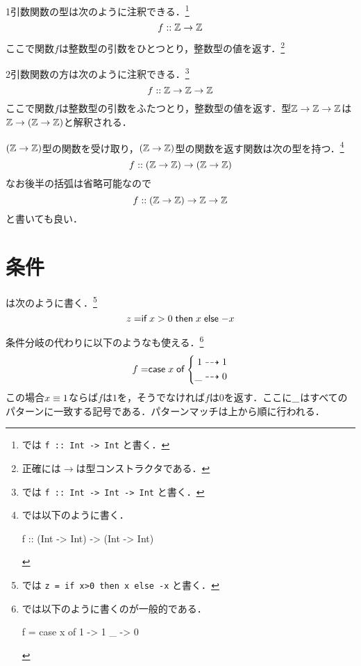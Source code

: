 \documentclass[platex,a5paper,twoside,fleqn,draft]{jsbook}
\newcommand{\keyword}[1]{\textgt{\textbf{#1}}}
\begin{document}
1引数関数の型は次のように注釈できる．\footnote{\haskell では \verb|f :: Int -> Int| と書く．}
\begin{equation}
f::\mathord{\mathbb{Z}}\rightarrow\mathord{\mathbb{Z}}
\end{equation}
ここで関数$f$は整数型の引数をひとつとり，整数型の値を返す．\footnote{正確には$\rightarrow$は型コンストラクタである．}

2引数関数の方は次のように注釈できる．\footnote{\haskell では \verb|f :: Int -> Int -> Int| と書く．}
\begin{equation}
f::\mathord{\mathbb{Z}}\rightarrow\mathord{\mathbb{Z}}\rightarrow\mathord{\mathbb{Z}}
\end{equation}
ここで関数$f$は整数型の引数をふたつとり，整数型の値を返す．型$\mathord{\mathbb{Z}}\rightarrow\mathord{\mathbb{Z}}\rightarrow\mathord{\mathbb{Z}}$は$\mathord{\mathbb{Z}}\rightarrow\left(\mathord{\mathbb{Z}}\rightarrow\mathord{\mathbb{Z}}\right)$と解釈される．

$(\mathord{\mathbb{Z}}\rightarrow\mathord{\mathbb{Z}})$型の関数を受け取り，$(\mathord{\mathbb{Z}}\rightarrow\mathord{\mathbb{Z}})$型の関数を返す関数は次の型を持つ．\footnote{\haskell では以下のように書く．
\begin{footcode}
      f :: (Int -> Int) -> (Int -> Int)
\end{footcode}}
\begin{equation}
f::\left(\mathord{\mathbb{Z}}\rightarrow\mathord{\mathbb{Z}}\right)\rightarrow\left(\mathord{\mathbb{Z}}\rightarrow\mathord{\mathbb{Z}}\right)
\end{equation}
なお後半の括弧は省略可能なので
\begin{equation}
f::\left(\mathord{\mathbb{Z}}\rightarrow\mathord{\mathbb{Z}}\right)\rightarrow\mathord{\mathbb{Z}}\rightarrow\mathord{\mathbb{Z}}
\end{equation}
と書いても良い．



\section{条件}

\keyword{条件分岐}は次のように書く．\footnote{\haskell では \verb|z = if x>0 then x else -x| と書く．}
\begin{equation}
z=\mathrel{\textsf{if}}x>0\mathrel{\textsf{then}}x\mathrel{\textsf{else}}-x
\end{equation}

条件分岐の代わりに以下のような\keyword{パターンマッチ}も使える．\footnote{\haskell では以下のように書くのが一般的である．
\begin{footcode}
      f = case x of 1 -> 1
                    _ -> 0
\end{footcode}}
\begin{equation}
f=\mathrel{\textsf{case}}x\mathrel{\textsf{of}}\left\{\begin{aligned}1&\dashrightarrow1\\\_&\dashrightarrow0\end{aligned}\right.
\end{equation}
この場合$x\equiv1$ならば$f$は$1$を，そうでなければ$f$は$0$を返す．ここに$\_$はすべてのパターンに一致する記号である．パターンマッチは上から順に行われる．
\end{document}
